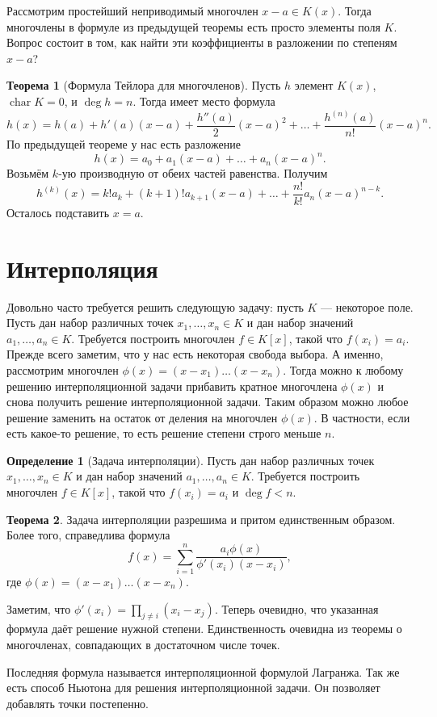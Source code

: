 \documentclass[10pt,a4paper,oneside]{book}
\theoremstyle{definition}
\newtheorem{defn}{Определение}
\newtheorem{thm}{Теорема}
\newcommand{\chr}{\operatorname{char}}
\def\thrm{\begin{thm}}
\def\ethrm{\end{thm}}
\def\dfn{\begin{defn}}
\def\edfn{\end{defn}}
\begin{document}
Рассмотрим простейший неприводимый многочлен $x-a \in K(x)$. Тогда многочлены в формуле из предыдущей теоремы есть просто элементы поля $K$. Вопрос состоит в том, как найти эти коэффициенты в разложении по степеням $x-a$?

\thrm[Формула Тейлора для многочленов]
Пусть $h$ элемент $K(x)$, $\chr K =0$, и $\deg h=n$. Тогда имеет место формула
 $$h(x)= h(a)+h'(a)(x-a)+\frac{h''(a)}{2}(x-a)^2+
 \dots + \frac{h^{(n)}(a)}{n!}(x-a)^n.$$
\proof По предыдущей теореме у нас есть разложение 
$$h(x)=a_0+a_1(x-a)+\dots+a_n(x-a)^n.$$
Возьмём $k$-ую производную от обеих частей равенства. Получим
$$ h^{(k)}(x)=k!a_k+(k+1)!a_{k+1}(x-a)+\dots+\frac{n!}{k!}a_n(x-a)^{n-k}.$$
Осталось подставить $x=a$.
\endproof
\ethrm


\section{Интерполяция}

Довольно часто требуется решить следующую задачу: пусть $K$ --- некоторое поле. Пусть дан набор различных точек
$x_1,\dots, x_n \in K$ и дан набор значений $a_1,\dots,a_n\in K$. Требуется построить многочлен $f\in K[x]$, такой что $f(x_i)=a_i$.
Прежде всего заметим, что у нас есть некоторая свобода выбора. А именно, рассмотрим многочлен $\phi(x)=(x-x_1)\dots(x-x_n)$. Тогда можно к любому решению интерполяционной задачи прибавить кратное многочлена $\phi(x)$ и снова получить решение интерполяционной задачи. Таким образом можно любое решение заменить на остаток от деления на многочлен $\phi(x)$. В частности, если есть какое-то решение, то есть решение степени строго меньше $n$.

\dfn[Задача интерполяции] Пусть дан набор различных точек $x_1,\dots,x_n\in K$ и дан набор значений
$a_1,\dots, a_n\in K$. Требуется построить многочлен $f\in K[x]$, такой что $f(x_i)=a_i$ и $\deg f < n$.
\edfn

\thrm Задача интерполяции разрешима и притом единственным образом. Более того, справедлива формула
$$f(x)=\sum_{i=1}^n \frac{a_i\phi(x)}{\phi'(x_i)(x-x_i)},$$
где $\phi(x)=(x-x_1)\dots(x-x_n)$.
\ethrm

\proof Заметим, что $\phi'(x_i)=\prod_{j\neq i}(x_i-x_j)$. Теперь очевидно, что указанная формула даёт решение нужной степени. Единственность очевидна из теоремы о многочленах, совпадающих в достаточном числе точек.
\endproof

Последняя формула называется интерполяционной формулой Лагранжа. Так же есть способ Ньютона для решения интерполяционной задачи.
Он позволяет добавлять точки постепенно.
\end{document}
